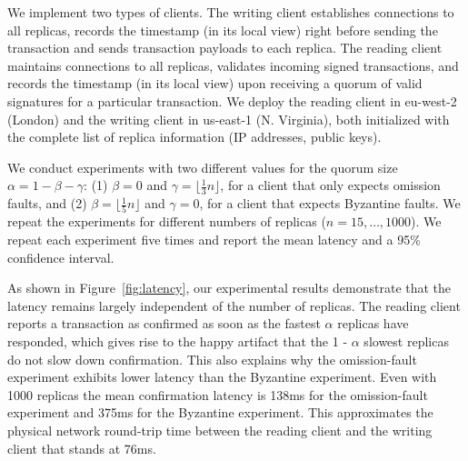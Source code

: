We implement two types of clients. The writing client establishes connections to all replicas, records
the timestamp (in its local view) right before sending the transaction and sends transaction
payloads to each replica. The reading client maintains connections to all replicas, validates incoming signed
transactions, and records the timestamp (in its local view) upon receiving a quorum of valid signatures for a particular transaction.
We deploy the reading
client in eu-west-2 (London) and the writing client in us-east-1 (N. Virginia), both initialized with the complete
list of replica information (IP addresses, public keys).

We conduct experiments with two different values for the quorum size $\alpha = 1 - \beta - \gamma$: (1) $\beta =0 $ and $\gamma = \lfloor \frac{1}{3} n \rfloor$, for a client that only expects omission faults,
and (2) $\beta = \lfloor\frac{1}{5}n\rfloor$ and $\gamma = 0$, for a client that expects Byzantine faults.
We repeat the experiments for
different numbers of replicas ($n = 15, \ldots, 1000$).
We repeat each experiment five times and report the mean latency and a 95\% confidence interval.


As shown in Figure~\ref{fig:latency}, our experimental results demonstrate that the latency remains largely independent
of the number of replicas.
The reading client reports a transaction as confirmed as soon as the fastest
$\alpha$ replicas have responded, which gives rise to the happy artifact that the 1 - $\alpha$ slowest replicas
do not slow down confirmation.
This also explains why the omission-fault experiment exhibits lower latency than the Byzantine experiment.
Even with 1000 replicas the mean confirmation latency is 138ms for the omission-fault experiment and 375ms for the Byzantine experiment.
This approximates
the physical network round-trip time between the reading client and the writing client that stands at 76ms.
